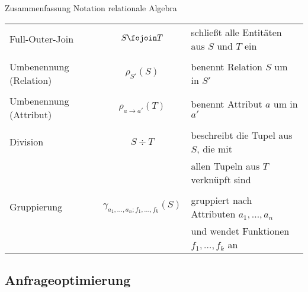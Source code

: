 \begin{bonus}{Zusammenfassung Notation relationale Algebra}
\begin{center}
\begin{tabular}{l|c|l}
            Full-Outer-Join                 & $S \fojoin T$                                    & schließt alle Entitäten aus $S$ und $T$ ein   \\
                                            &                                                  &                                               \\
            Umbenennung (Relation)          & $\rho_{S'}(S)$                                   & benennt Relation $S$ um in $S'$               \\
                                            &                                                  &                                               \\
            Umbenennung (Attribut)          & $\rho_{a \to a'}(T)$                             & benennt Attribut $a$ um in $a'$               \\
                                            &                                                  &                                               \\
            Division                        & $S \div T $                                      & beschreibt die Tupel aus $S$, die mit         \\
                                            &                                                  & allen Tupeln aus $T$ verknüpft sind           \\
                                            &                                                  &                                               \\
            Gruppierung                     & $\gamma_{a_1, \ldots, a_n; f_1, \ldots, f_k}(S)$ & gruppiert nach Attributen $a_1, \ldots, a_n$  \\
                                            &                                                  & und wendet Funktionen $f_1, \ldots, f_k$ an
        \end{tabular}
    \end{center}
\end{bonus}


\subsection{Anfrageoptimierung}

